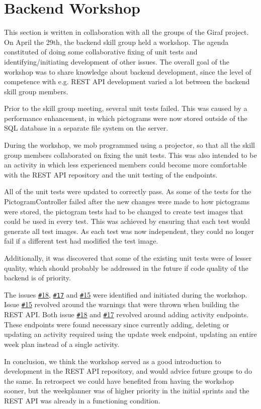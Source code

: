 \section{Backend Workshop} \label{SEC:workshopAPIcollab}
This section is written in collaboration with all the groups of the Giraf project.
On April the 29th, the backend skill group held a workshop.
The agenda constituted of doing some collaborative fixing of unit tests and identifying/initiating development of other issues.
The overall goal of the workshop was to share knowledge about backend development, since the level of competence with e.g. REST API development varied a lot between the backend skill group members. 

Prior to the skill group meeting, several unit tests failed.
This was caused by a performance enhancement, in which pictograms were now stored outside of the SQL database in a separate file system on the server. 

During the workshop, we mob programmed using a projector, so that all the skill group members collaborated on fixing the unit tests.
This was also intended to be an activity in which less experienced members could become more comfortable with the REST API repository and the unit testing of the endpoints. 

All of the unit tests were updated to correctly pass.
As some of the tests for the PictogramController failed after the new changes were made to how pictograms were stored, the pictogram tests had to be changed to create test images that could be used in every test.
This was achieved by ensuring that each test would generate all test images.
As each test was now independent, they could no longer fail if a different test had modified the test image.

Additionally, it was discovered that some of the existing unit tests were of lesser quality, which should probably be addressed in the future if code quality of the backend is of priority. 


The issues \href{https://github.com/aau-giraf/web-api/issues/18}{\texttt{\#}18}, \href{https://github.com/aau-giraf/web-api/issues/17}{\texttt{\#17}} and \href{https://github.com/aau-giraf/web-api/issues/15}{\texttt{\#}15} were identified and initiated during the workshop.
Issue \href{https://github.com/aau-giraf/web-api/issues/15}{\texttt{\#}15} revolved around the warnings that were thrown when building the REST API.
Both issue \href{https://github.com/aau-giraf/web-api/issues/18}{\texttt{\#}18} and \href{https://github.com/aau-giraf/web-api/issues/17}{\texttt{\#}17} revolved around adding activity endpoints.
These endpoints were found necessary since currently adding, deleting or updating an activity required using the update week endpoint, updating an entire week plan instead of a single activity. 
 
In conclusion, we think the workshop served as a good introduction to development in the REST API repository, and would advice future groups to do the same.
In retrospect we could have benefited from having the workshop sooner, but the weekplanner was of higher priority in the initial sprints and the REST API was already in a functioning condition.

